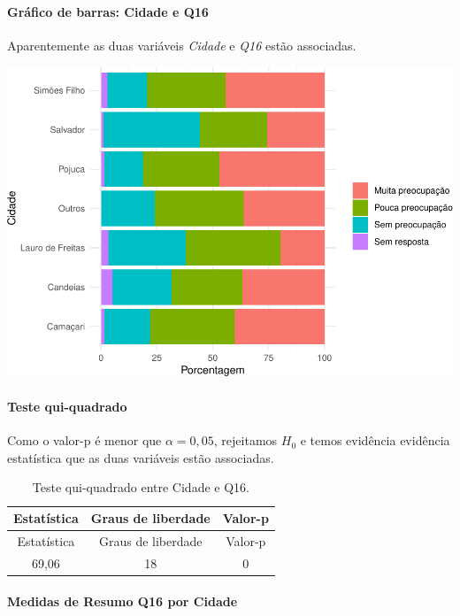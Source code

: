 \documentclass[]{article}
\let\oldparagraph\paragraph
\renewcommand{\paragraph}[1]{\oldparagraph{#1}\mbox{}}
\begin{document}
\hypertarget{gruxe1fico-de-barras-cidade-e-q16}{%
\paragraph{Gráfico de barras: Cidade e Q16}\label{gruxe1fico-de-barras-cidade-e-q16}}

Aparentemente as duas variáveis \emph{Cidade} e \emph{Q16} estão associadas.

\begin{center}\includegraphics[width=0.75\linewidth]{relatorio_files/figure-latex/unnamed-chunk-137-1} \end{center}

\hypertarget{teste-qui-quadrado-12}{%
\paragraph{Teste qui-quadrado}\label{teste-qui-quadrado-12}}

Como o valor-p é menor que \(\alpha=0,05\), rejeitamos \(H_0\) e temos evidência evidência estatística que as duas variáveis estão associadas.

\begin{longtable}[]{@{}ccc@{}}
\caption{\label{tab:unnamed-chunk-138}Teste qui-quadrado entre Cidade e Q16.}\tabularnewline
\toprule
Estatística & Graus de liberdade & Valor-p\tabularnewline
\midrule
\endfirsthead
\toprule
Estatística & Graus de liberdade & Valor-p\tabularnewline
\midrule
\endhead
69,06 & 18 & 0\tabularnewline
\bottomrule
\end{longtable}

\cleardoublepage

\hypertarget{medidas-de-resumo-q16-por-cidade}{%
\paragraph{Medidas de Resumo Q16 por Cidade}\label{medidas-de-resumo-q16-por-cidade}}
\end{document}

